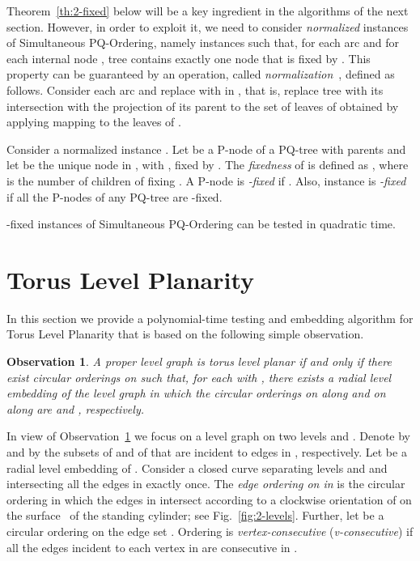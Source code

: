 \documentclass{llncs}
\newtheorem{observation}{Observation}
\begin{document}
Theorem~\ref{th:2-fixed} below will be a key ingredient in the algorithms of the next section. However, in order to exploit it, we need to consider {\em normalized} instances of {\sc Simultaneous PQ-Ordering}, namely instances  such that, for each arc  and for each internal node , tree  contains exactly one node  that is fixed by . This property can be guaranteed by an operation, called {\em normalization}~\cite{br-spacep-13}, defined as follows. Consider each arc  and replace  with  in , that is, replace tree  with its intersection with the projection of its parent  to the set of leaves of  obtained by applying mapping  to the leaves  of . 

Consider a normalized instance .
Let  be a P-node of a PQ-tree  with parents  and let  be the unique node in , with , fixed by . The {\em fixedness}  of  is defined as , where  is the number of children of  fixing . A P-node  is \emph{-fixed} if . Also, instance  is \emph{-fixed} if all the P-nodes of any PQ-tree  are -fixed. 

\begin{theorem}\label{th:2-fixed} -fixed instances of {\sc Simultaneous PQ-Ordering} can be tested in quadratic time.
\end{theorem}
 


\section{Torus Level Planarity} \label{se:cyclic}

In this section we provide a polynomial-time testing and embedding algorithm for {\sc Torus Level Planarity} that is based on the following simple observation.

\begin{observation}\label{prop:characterization}
A proper level graph  is torus level planar if and only if 
there exist circular orderings  on 
such that, for each  with , there exists a radial level embedding of the level graph  in which the circular orderings on  along  and on  along  are  and , respectively.
\end{observation}


In view of Observation~\ref{prop:characterization} we focus on a level graph  on two levels  and . Denote by  and by  the subsets of  and of  that are incident to edges in , respectively.
Let  be a radial level embedding of .
Consider a closed curve  separating levels  and  and intersecting all the edges in  exactly once.
The {\em edge ordering on  in } is the circular ordering in which the edges in  intersect  according to a clockwise orientation of  on the surface~ of the standing cylinder; see Fig.~\ref{fig:2-levels}.
Further, let  be a circular ordering on the edge set . Ordering  is {\em vertex-consecutive} ({\em v-consecutive}) if all the edges incident to each vertex in  are consecutive in . 
\end{document}
